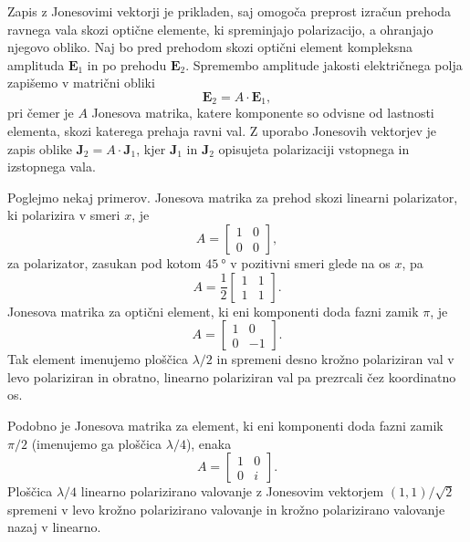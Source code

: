 Zapis z Jonesovimi vektorji je prikladen, saj omogoča preprost izračun
prehoda ravnega vala skozi optične elemente, ki spreminjajo polarizacijo,
a ohranjajo njegovo obliko. Naj bo pred prehodom skozi optični element kompleksna
amplituda $\mathbf{E}_1$ in po prehodu $\mathbf{E}_2$. Spremembo amplitude 
jakosti električnega polja zapišemo v matrični obliki
\begin{equation}
\mathbf{E}_{2}=A\cdot\mathbf{E}_{1},
\end{equation}
pri čemer je $A$ Jonesova matrika, katere komponente so odvisne od
lastnosti elementa, skozi katerega prehaja ravni val. 
Z uporabo Jonesovih vektorjev je zapis oblike $\mathbf{J}_{2}=A\cdot\mathbf{J}_{1}$, 
kjer $\mathbf{J}_{1}$ in $\mathbf{J}_{2}$ opisujeta polarizaciji vstopnega in izstopnega vala. 

Poglejmo nekaj primerov. Jonesova matrika za prehod skozi linearni polarizator, ki
polarizira v smeri $x$, je
\begin{equation}
A=\left[\begin{array}{cc}
1 & 0\\
0 & 0
\end{array}\right],
\end{equation}
za polarizator, zasukan pod kotom $45~\si{\degree}$ v pozitivni smeri glede na os $x$, pa
\begin{equation}
A=\frac{1}{2}\left[\begin{array}{cc}
1 & 1\\
1 & 1
\end{array}\right].
\end{equation}
Jonesova matrika za optični element, ki eni komponenti doda fazni zamik $\pi$, je
\begin{equation}
A=\left[\begin{array}{cc}
1 & 0\\
0 & -1
\end{array}\right].
\end{equation}
Tak element imenujemo ploščica $\lambda/2$ in 
spremeni desno krožno polariziran val v levo 
polariziran in obratno, linearno polariziran val pa prezrcali čez koordinatno os. 

Podobno je Jonesova matrika za element, ki eni komponenti doda fazni zamik $\pi/2$ 
(imenujemo ga ploščica $\lambda/4$), enaka
\begin{equation}
A=\left[\begin{array}{cc}
1 & 0\\
0 & i
\end{array}\right].
\end{equation}
Ploščica $\lambda/4$ linearno polarizirano valovanje z Jonesovim vektorjem $(1,1)/\sqrt{2}$
spremeni v levo krožno polarizirano valovanje in krožno polarizirano
valovanje nazaj v linearno. 


